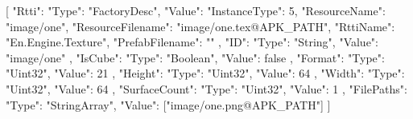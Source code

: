 [{
        "Rtti": {
            "Type": "FactoryDesc",
            "Value": {
                "InstanceType": 5,
                "ResourceName": "image/one",
                "ResourceFilename": "image/one.tex@APK_PATH",
                "RttiName": "En.Engine.Texture",
                "PrefabFilename": ""
            }
        },
        "ID": {
            "Type": "String",
            "Value": "image/one"
        },
        "IsCube": {
            "Type": "Boolean",
            "Value": false
        },
        "Format": {
            "Type": "Uint32",
            "Value": 21
        },
        "Height": {
            "Type": "Uint32",
            "Value": 64
        },
        "Width": {
            "Type": "Uint32",
            "Value": 64
        },
        "SurfaceCount": {
            "Type": "Uint32",
            "Value": 1
        },
        "FilePaths": {
            "Type": "StringArray",
            "Value": ["image/one.png@APK_PATH"]
        }
    }]